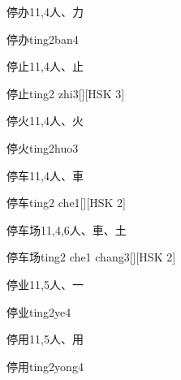 \begin{Entry}{停办}{11,4}{⼈、⼒}
  \begin{Phonetics}{停办}{ting2ban4}
  \end{Phonetics}
\end{Entry}

\begin{Entry}{停止}{11,4}{⼈、⽌}
  \begin{Phonetics}{停止}{ting2 zhi3}[][HSK 3]
  \end{Phonetics}
\end{Entry}

\begin{Entry}{停火}{11,4}{⼈、⽕}
  \begin{Phonetics}{停火}{ting2huo3}
  \end{Phonetics}
\end{Entry}

\begin{Entry}{停车}{11,4}{⼈、⾞}
  \begin{Phonetics}{停车}{ting2 che1}[][HSK 2]
  \end{Phonetics}
\end{Entry}

\begin{Entry}{停车场}{11,4,6}{⼈、⾞、⼟}
  \begin{Phonetics}{停车场}{ting2 che1 chang3}[][HSK 2]
  \end{Phonetics}
\end{Entry}

\begin{Entry}{停业}{11,5}{⼈、⼀}
  \begin{Phonetics}{停业}{ting2ye4}
  \end{Phonetics}
\end{Entry}

\begin{Entry}{停用}{11,5}{⼈、⽤}
  \begin{Phonetics}{停用}{ting2yong4}
  \end{Phonetics}
\end{Entry}

